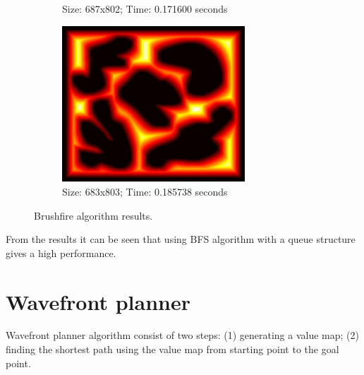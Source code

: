 \documentclass[a4paper]{article}
\begin{document}
\begin{figure}[H]
\begin{subfigure}[t]{3in}
		\caption{Size: 687x802; Time: 0.171600 seconds}\label{fig:bf-c}
	\end{subfigure}
	\quad
	\begin{subfigure}[t]{3in}
		\centering
		\includegraphics[height=2.3in]{bf-obstaclesBig}
		\caption{Size: 683x803; Time: 0.185738 seconds}\label{fig:bf-d}
	\end{subfigure}
\caption{Brushfire algorithm results.}
\label{fig:bf-map}
\end{figure}

From the results it can be seen that using BFS algorithm with a queue structure gives a high performance.

\section{Wavefront planner}
Wavefront planner algorithm consist of two steps: (1) generating a value map; (2) finding the shortest path using the value map from starting point to the goal point.
\end{document}
